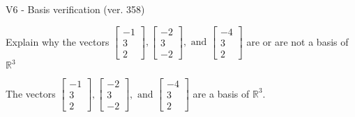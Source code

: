 \begin{exercise}
  \begin{exerciseTitle}V6 - Basis verification (ver. 358)\end{exerciseTitle}
  \begin{exerciseStatement}
    Explain why the vectors \(\left[\begin{array}{r}
-1 \\
3 \\
2
\end{array}\right] , \left[\begin{array}{r}
-2 \\
3 \\
-2
\end{array}\right] , \text{ and } \left[\begin{array}{r}
-4 \\
3 \\
2
\end{array}\right]\) are or are not a basis of \(\mathbb{R}^3\)	


  \end{exerciseStatement}
  \begin{exerciseAnswer}
   The vectors \(\left[\begin{array}{r}
-1 \\
3 \\
2
\end{array}\right] , \left[\begin{array}{r}
-2 \\
3 \\
-2
\end{array}\right] , \text{ and } \left[\begin{array}{r}
-4 \\
3 \\
2
\end{array}\right]\) 
  	 are  a basis of \(\mathbb{R}^3\).
  


  \end{exerciseAnswer}
\end{exercise}